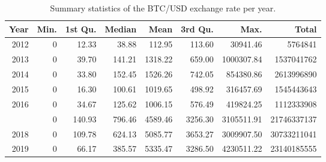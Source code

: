 \begin{table}[t]

\caption{\label{tab:}Summary statistics of the BTC/USD exchange rate per year.}
\centering
\begin{tabular}{rrrrrrrr}
\toprule
Year & Min. & 1st Qu. & Median & Mean & 3rd Qu. & Max. & Total\\
\midrule
2012 & 0 & 12.33 & 38.88 & 112.95 & 113.60 & 30941.46 & 5764841\\
2013 & 0 & 39.70 & 141.21 & 1318.22 & 659.00 & 1000307.84 & 1537041762\\
2014 & 0 & 33.80 & 152.45 & 1526.26 & 742.05 & 854380.86 & 2613996890\\
2015 & 0 & 16.30 & 100.61 & 1019.65 & 498.92 & 316457.69 & 1545443643\\
2016 & 0 & 34.67 & 125.62 & 1006.15 & 576.49 & 419824.25 & 1112333908\\
\addlinespace
2017 & 0 & 140.93 & 796.46 & 4589.46 & 3256.30 & 3105511.91 & 21746337137\\
2018 & 0 & 109.78 & 624.13 & 5085.77 & 3653.27 & 3009907.50 & 30733211041\\
2019 & 0 & 66.17 & 385.57 & 5335.47 & 3286.50 & 4230511.22 & 23140185555\\
\bottomrule
\end{tabular}
\end{table}
